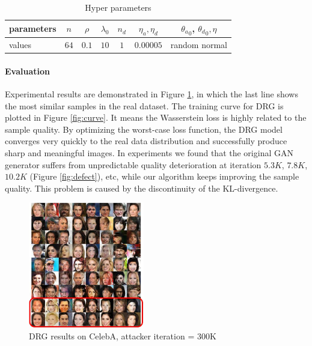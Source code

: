 \documentclass{article}
\begin{document}
\begin{table}[htb]
\caption{Hyper parameters}
\label{tab:para}
\begin{center}
\begin{tabular}{|l|c|c|c|c|c|c|}

\hline
parameters &  $n$  &  $\rho$  &  $\lambda_0$  &  $n_d$  &  $\eta_a, \eta_d$  &  ${\theta_a}_0$, ${\theta_d}_0, \eta$
\\ \hline
values     &  $64$ &  $0.1$   &  $10$         &  $1$    &  $0.00005$  &  random normal
\\ \hline
\end{tabular}
\end{center}
\end{table}

\paragraph{Evaluation}
Experimental results are demonstrated in Figure \ref{fig:ep2}, in which the last line shows the most similar samples in the real dataset.
The training curve for DRG is plotted in Figure \ref{fig:curve}. It means the Wasserstein loss is highly related to the sample quality. By optimizing the worst-case loss function, the DRG model converges very quickly to the real data distribution and successfully produce sharp and meaningful images. In experiments we found that the original GAN generator \cite{DBLP:journals/corr/RadfordMC15} suffers from unpredictable quality deterioration at iteration $5.3K$, $7.8K$, $10.2K$ (Figure \ref{fig:defect}), etc, while our algorithm keeps improving the sample quality. This problem is caused by the discontinuity of the KL-divergence.

\begin{figure}[htb]
\centering
\includegraphics[width=0.45\textwidth]{FIGDRG/result}
\caption{DRG results on CelebA, attacker iteration = 300K }
\label{fig:ep2}
\end{figure}
\end{document}
